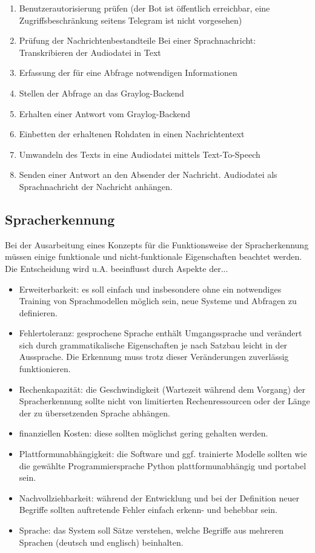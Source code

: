 \begin{enumerate}
\item Benutzerautorisierung prüfen (der Bot ist öffentlich erreichbar, eine Zugriffsbeschränkung seitens Telegram ist nicht vorgesehen)
\item Prüfung der Nachrichtenbestandteile
 Bei einer Sprachnachricht: Transkribieren der Audiodatei in Text
\item Erfassung der für eine Abfrage notwendigen Informationen
\item Stellen der Abfrage an das Graylog-Backend
\item Erhalten einer Antwort vom Graylog-Backend
\item Einbetten der erhaltenen Rohdaten in einen Nachrichtentext
\item Umwandeln des Texts in eine Audiodatei mittels Text-To-Speech
\item Senden einer Antwort an den Absender der Nachricht. Audiodatei als Sprachnachricht der Nachricht anhängen.
\end{enumerate}

\subsection{Spracherkennung}

Bei der Ausarbeitung eines Konzepts für die Funktionsweise der Spracherkennung müssen einige funktionale und nicht-funktionale Eigenschaften beachtet werden. Die Entscheidung wird u.A. beeinflusst durch Aspekte der... 

\begin{itemize}
\item Erweiterbarkeit: es soll einfach und insbesondere ohne ein notwendiges Training von Sprachmodellen möglich sein, neue Systeme und Abfragen zu definieren.
\item Fehlertoleranz: gesprochene Sprache enthält Umgangssprache und verändert sich durch grammatikalische Eigenschaften je nach Satzbau leicht in der Aussprache. Die Erkennung muss trotz dieser Veränderungen zuverlässig funktionieren.
\item Rechenkapazität: die Geschwindigkeit (Wartezeit während dem Vorgang) der Spracherkennung sollte nicht von limitierten Rechenressourcen oder der Länge der zu übersetzenden Sprache abhängen.
\item finanziellen Kosten: diese sollten möglichst gering gehalten werden.
\item Plattformunabhängigkeit: die Software und ggf. trainierte Modelle sollten wie die gewählte Programmiersprache Python plattformunabhängig und portabel sein.
\item Nachvollziehbarkeit: während der Entwicklung und bei der Definition neuer Begriffe sollten auftretende Fehler einfach erkenn- und behebbar sein.
\item Sprache: das System soll Sätze verstehen, welche Begriffe aus mehreren Sprachen (deutsch und englisch) beinhalten.
\end{itemize}

